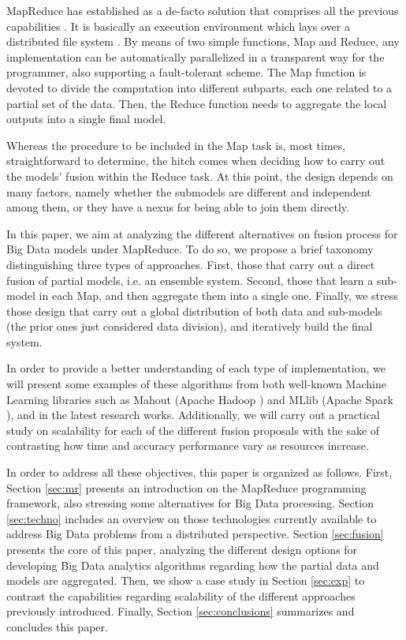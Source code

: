 \documentclass[3p,review]{elsarticle}
\begin{document}
MapReduce has established as a de-facto solution that comprises all the previous capabilities \cite{Dea08,Dean10,Lee11-MR}. It is basically an execution environment which lays over a distributed file system \cite{Shvachko10-HDFS}. By means of two simple functions, Map and Reduce, any implementation can be automatically parallelized in a transparent way for the programmer, also supporting a fault-tolerant scheme. The Map function is devoted to divide the computation into different subparts, each one related to a partial set of the data. Then, the Reduce function needs to aggregate the local outputs into a single final model. 

Whereas the procedure to be included in the Map task is, most times, straightforward to determine, the hitch comes when deciding how to carry out the models' fusion within the Reduce task. At this point, the design depends on many factors, namely whether the submodels are different and independent among them, or they have a nexus for being able to join them directly. 

In this paper, we aim at analyzing the different alternatives on fusion process for Big Data models under MapReduce. To do so, we propose a brief taxonomy distinguishing three types of approaches. First, those that carry out a direct fusion of partial models, i.e. an ensemble system. Second, those that learn a sub-model in each Map, and then aggregate them into a single one. Finally, we stress those design that carry out a global distribution of both data and sub-models (the prior ones just considered data division), and iteratively build the final system.

In order to provide a better understanding of each type of implementation, we will present some examples of these algorithms from both well-known Machine Learning libraries such as Mahout \cite{Owe11,Mahout17,Mahout16-Book} (Apache Hadoop \cite{Lam11,Whi15-Hadoop}) and MLlib \cite{MLlib} (Apache Spark \cite{Zaharia10,zaharia12}), and in the latest research works. Additionally, we will carry out a practical study on scalability for each of the different fusion proposals with the sake of contrasting how time and accuracy performance vary as resources increase. 

In order to address all these objectives, this paper is organized as follows. First, Section \ref{sec:mr} presents an introduction on the MapReduce programming framework, also stressing some alternatives for Big Data processing. Section \ref{sec:techno} includes an overview on those technologies currently available to address Big Data problems from a distributed perspective. Section \ref{sec:fusion} presents the core of this paper, analyzing the different design options for developing Big Data analytics algorithms regarding how the partial data and models are aggregated. Then, we show a case study in Section \ref{sec:exp} to contrast the capabilities regarding scalability of the different approaches previously introduced. Finally, Section \ref{sec:conclusions} summarizes and concludes this paper.
\end{document}
